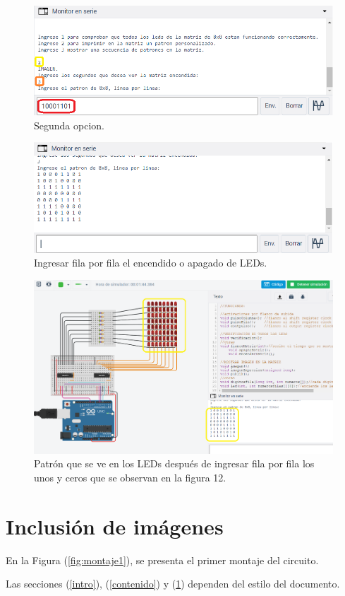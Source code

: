 \documentclass{article}
\begin{document}
\begin{enumerate}
\begin{figure}[h]
\includegraphics[scale=0.6]{opc2.png}
\centering
\caption{Segunda opcion.}
\label{fig:opcion2}
\end{figure}

\begin{figure}[h]
\includegraphics[scale=0.6]{matrizleds.png}
\centering
\caption{Ingresar fila por fila el encendido o apagado de LEDs.}
\label{fig:matrizleds}
\end{figure}

\newpage
\begin{figure}[h]
\includegraphics[scale=0.5]{patronper.png}
\centering
\caption{Patrón que se ve en los LEDs después de ingresar fila por fila los unos y ceros que se observan en la figura 12.}
\label{fig:patronper}
\end{figure}

\end{enumerate}


\section{Inclusión de imágenes} \label{imagenes}

En la Figura (\ref{fig:montaje1}), se presenta el primer montaje del circuito. 

Las secciones (\ref{intro}), (\ref{contenido}) y (\ref{imagenes}) dependen del estilo del documento.



\end{document}
